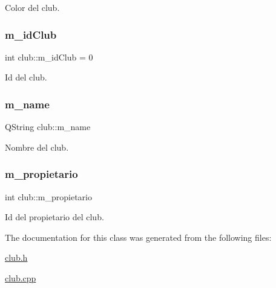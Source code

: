 Color del club. \mbox{\label{classclub_a903a48e2c7351cac51ecbf416f905d6e}} 
\subsubsection{\texorpdfstring{m\+\_\+id\+Club}{m\_idClub}}
{\footnotesize\ttfamily int club\+::m\+\_\+id\+Club = 0\hspace{0.3cm}{\ttfamily [private]}}

Id del club. \mbox{\label{classclub_a5662adc7efe68e0cdfb873137d8ed019}} 
\subsubsection{\texorpdfstring{m\+\_\+name}{m\_name}}
{\footnotesize\ttfamily Q\+String club\+::m\+\_\+name\hspace{0.3cm}{\ttfamily [private]}}

Nombre del club. \mbox{\label{classclub_ab1d8565c370614f5903c2cc199216af9}} 
\subsubsection{\texorpdfstring{m\+\_\+propietario}{m\_propietario}}
{\footnotesize\ttfamily int club\+::m\+\_\+propietario\hspace{0.3cm}{\ttfamily [private]}}

Id del propietario del club. 

The documentation for this class was generated from the following files\+:\begin{DoxyCompactItemize}
\item 
\mbox{\hyperlink{club_8h}{club.\+h}}\item 
\mbox{\hyperlink{club_8cpp}{club.\+cpp}}\end{DoxyCompactItemize}
